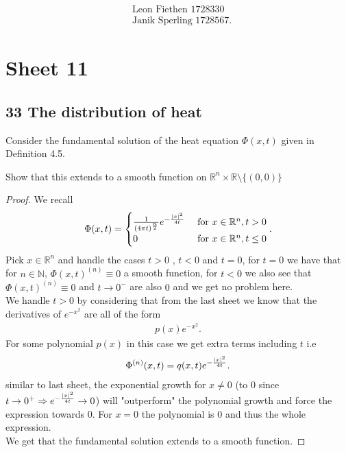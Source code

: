 \begin{align*}
  &\text{Leon Fiethen 1728330}\\
 &\text{Janik Sperling 1728567}
.\end{align*}
\section*{Sheet 11}
\subsection*{33 The distribution of heat}
Consider the fundamental solution of the heat equation $\Phi(x,t)$ given in Definition 4.5.
\begin{exercise}[a]
 Show that this extends to a smooth function on $\mathbb{R}^{n} \times  \mathbb{R} \setminus \{(0,0)\}   $ 
\end{exercise}
\begin{proof}
 We recall 
 \begin{align*}
  \Phi(x,t) = \begin{cases}
    \frac{1}{(4\pi t)^{\frac{n}{2}}}e^{-\frac{\lvert x\rvert^2}{4t}}  &\text{ for } x \in  \mathbb{R}^{n} ,t > 0\\
    0  &\text{ for } x \in  \mathbb{R}^{n} ,t\le  0\\
  \end{cases}
 .\end{align*}
 Pick $x \in  \mathbb{R}^{n} $ and handle the cases $t>0$ , $t<0$ and $t=0$,
 for $t=0$ we have that for $n \in  \mathbb{N}$,  $\Phi(x,t)^{(n)} \equiv 0 $ a smooth function,
 for $t<0$ we also see that $\Phi(x,t)^{(n)} \equiv 0 $ and $t\to 0^{-}  $ are also $0$ and we get no problem here.
 \\[1ex]
 We handle $t>0$ by considering that from the last sheet we know that the derivatives of $e^{-x^2} $ are all of the form 
 \begin{align*}
  p(x)e^{-x^2} 
 .\end{align*}
 For some polynomial $p(x)$ in this case we get extra terms including $t$ i.e 
 \begin{align*}
   \Phi^{(n)}(x,t) = q(x,t)e^{-\frac{\lvert x\rvert^2}{4t}}  
 .\end{align*}
 similar to last sheet, the exponential growth for $x\neq 0$ (to 0 since $t\to 0^{+} \Rightarrow e^{-\frac{\lvert x\rvert^2}{4t}}\to 0 $) 
 will "outperform" the polynomial growth and force the expression towards 0. For $x=0$ the polynomial is $0$ and thus the whole expression.\\[1ex]
 We get that the fundamental solution extends to a smooth function.
\end{proof}
